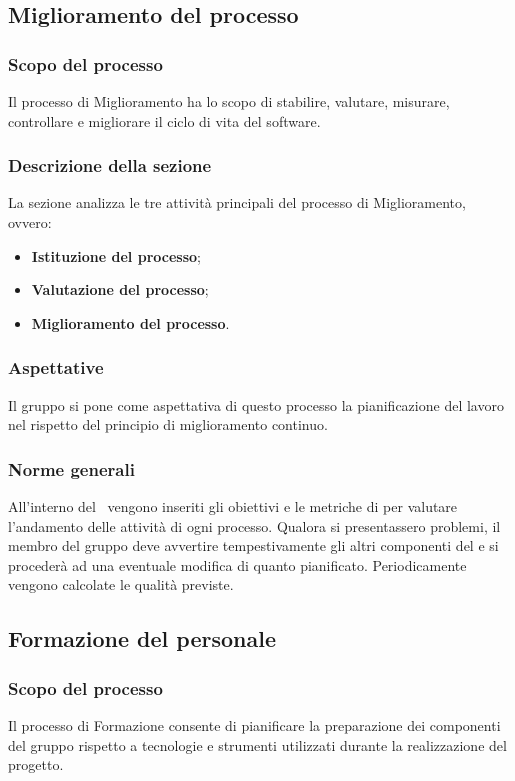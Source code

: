 \subsection{Miglioramento del processo}
\subsubsection{Scopo del processo}
Il processo di Miglioramento ha lo scopo di stabilire, valutare, misurare, controllare e migliorare il ciclo di vita del software.
\subsubsection{Descrizione della sezione}
La sezione analizza le tre attività principali del processo di Miglioramento, ovvero:
\begin{itemize}
	\item \textbf{Istituzione del processo};	
	\item \textbf{Valutazione del processo};
	\item \textbf{Miglioramento del processo}.
\end{itemize}
\subsubsection{Aspettative}
Il gruppo si pone come aspettativa di questo processo la pianificazione del lavoro nel rispetto del principio di miglioramento continuo.
\subsubsection{Norme generali}\label{PO_NormeGenerali}
All'interno del \PdQv{}\ vengono inseriti gli obiettivi e le metriche di  per valutare l'andamento delle attività di ogni processo. Qualora si presentassero problemi, il membro del gruppo deve avvertire tempestivamente gli altri componenti del  e si procederà ad una eventuale modifica di quanto pianificato. Periodicamente vengono calcolate le qualità previste.

\subsection{Formazione del personale}
\subsubsection{Scopo del processo}
Il processo di Formazione consente di pianificare la preparazione dei componenti del gruppo rispetto a tecnologie e strumenti utilizzati durante la realizzazione del progetto.
